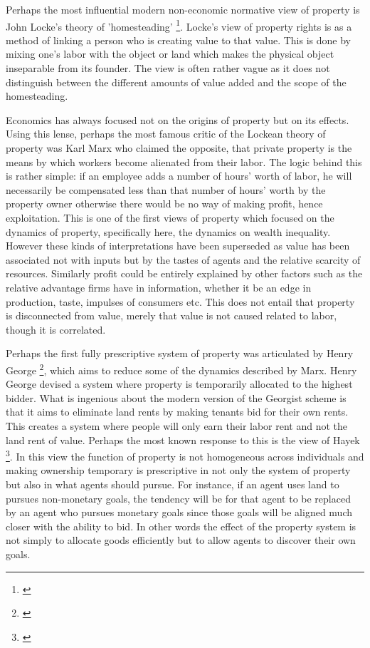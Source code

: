 \documentclass[12pt]{report}
\numberwithin{equation}{section}
\begin{document}
Perhaps the most influential modern non-economic normative view of property is John Locke's theory of 'homesteading' \footnote{\cite{locke2014second}}. Locke's view of property rights is as a method of linking a person who is creating value to that value. This is done by mixing one's labor with the object or land which makes the physical object inseparable from its founder. The view is often rather vague as it does not distinguish between the different amounts of value added and the scope of the homesteading. 

Economics has always focused not on the origins of property but on its effects. Using this lense, perhaps the most famous critic of the Lockean theory of property was Karl Marx who claimed the opposite, that private property is the means by which workers become alienated from their labor. The logic behind this is rather simple: if an employee adds a number of hours’ worth of labor, he will necessarily be compensated less than that number of hours’ worth by the property owner otherwise there would be no way of making profit, hence exploitation. This is one of the first views of property which focused on the dynamics of property, specifically here, the dynamics on wealth inequality. However these kinds of interpretations have been superseded as value has been associated not with inputs but by the tastes of agents and the relative scarcity of resources. Similarly profit could be entirely explained by other factors such as the relative advantage firms have in information, whether it be an edge in production, taste, impulses of consumers etc. This does not entail that property is disconnected from value, merely that value is not caused related to labor, though it is correlated.

Perhaps the first fully prescriptive system of property was articulated by Henry George \footnote{\cite{progress}}, which aims to reduce some of the dynamics described by Marx. Henry George devised a system where property is temporarily allocated to the highest bidder. What is ingenious about the modern version of the Georgist scheme is that it aims to eliminate land rents by making tenants bid for their own rents. This creates a system where people will only earn their labor rent and not the land rent of value. Perhaps the most known response to this is the view of Hayek \footnote{\cite{Fatal}}. In this view the function of property is not homogeneous across individuals and making ownership temporary is prescriptive in not only the system of property but also in what agents should pursue. For instance, if an agent uses land to pursues non-monetary goals, the tendency will be for that agent to be replaced by an agent who pursues monetary goals since those goals will be aligned much closer with the ability to bid. In other words the effect of the property system is not simply to allocate goods efficiently but to allow agents to discover their own goals. 
\end{document}
